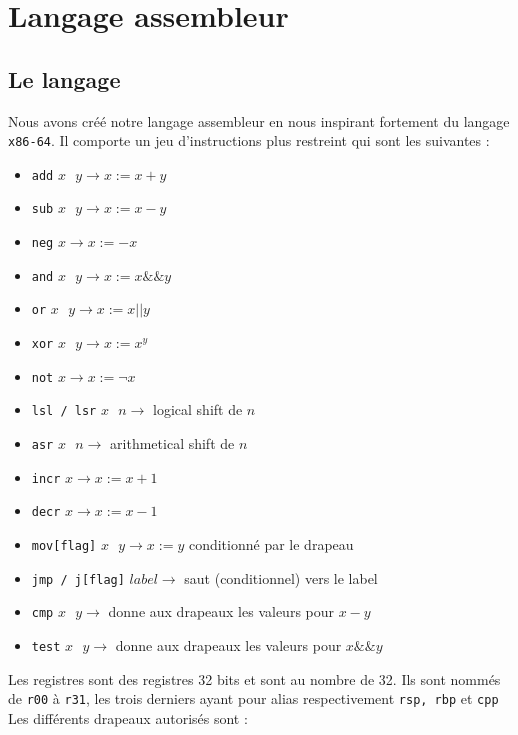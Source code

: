 \documentclass[10pt,a4paper,notitlepage ]{article}
\begin{document}
\section{Langage assembleur}
\subsection{Le langage}
	\par{Nous avons créé notre langage assembleur en nous inspirant fortement du langage \texttt{x86-64}. Il comporte un jeu d'instructions plus restreint qui sont les suivantes :
	\begin{itemize}
		\item \texttt{add} $x \text{ } y \rightarrow x := x + y$
		\item \texttt{sub} $x \text{ } y \rightarrow x := x - y$
		\item \texttt{neg} $x \rightarrow x := - x $
		\item \texttt{and} $x \text{ } y \rightarrow x := x \&\& y$
		\item \texttt{or} $x \text{ } y \rightarrow x := x || y$
		\item \texttt{xor} $x \text{ } y \rightarrow x := x ^ y$
		\item \texttt{not} $x \rightarrow x := \neg x$
		\item \texttt{lsl / lsr} $x \text{ } n \rightarrow $ logical shift de $n$
		\item \texttt{asr} $x \text{ } n \rightarrow $ arithmetical shift de $n$
		\item \texttt{incr} $x \rightarrow x := x + 1$
		\item \texttt{decr} $x \rightarrow x := x - 1$
		\item \texttt{mov[flag]} $x \text{ } y \rightarrow x := y$ conditionné par le drapeau
		\item \texttt{jmp / j[flag]} $label \rightarrow $ saut (conditionnel) vers le label
		\item \texttt{cmp} $x \text{ } y \rightarrow $ donne aux drapeaux les valeurs pour $x - y$
		\item \texttt{test} $x \text{ } y \rightarrow $ donne aux drapeaux les valeurs pour $x \&\& y$
	\end{itemize}
	Les registres sont des registres 32 bits et sont au nombre de 32. Ils sont nommés de \texttt{r00} à \texttt{r31}, les trois derniers ayant pour alias respectivement \texttt{rsp, rbp} et \texttt{cpp}\\
	Les différents drapeaux autorisés sont :
	\begin{itemize}

\end{itemize}}
\end{document}
